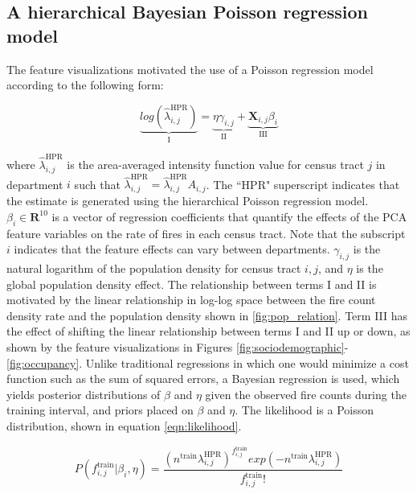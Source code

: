 \documentclass{svjour3}
\begin{document}
  
  
  \clearpage
  
 \subsection{A hierarchical Bayesian Poisson regression model}
 \label{sec:bayes}
 The feature visualizations motivated the use of a Poisson regression model according to the following form:
 
 \begin{equation}
  \label{eqn:poisson_regression}
  \underbrace{log(\hat\lambda^{\text{HPR}}_{i,j})}_{\text{I}} =   \underbrace{\eta\gamma_{i,j}}_{\text{II}} + \underbrace{\textbf{X}_{i,j}\beta_{i}}_{\text{III}}
\end{equation}

\noindent where $\hat\lambda^{\text{HPR}}_{i,j}$ is the area-averaged intensity function value for census tract $j$ in department $i$ such that $\hat\lambda^{\text{HPR}}_{i,j}=\hat\lambda^{\text{HPR}}_{i,j}A_{i,j}$. The ``HPR" superscript indicates that the estimate is generated using the hierarchical Poisson regression model. $\beta_i \in \textbf{R}^{10}$ is a vector of regression coefficients that quantify the effects of the PCA feature variables on the rate of fires in each census tract. Note that the subscript $i$ indicates that the feature effects can vary between departments. $\gamma_{i,j}$ is the natural logarithm of the population density for census tract $i,j$, and $\eta$ is the global population density effect. The relationship between terms I and II is motivated by the linear relationship in log-log space between the fire count density rate and the population density shown in \ref{fig:pop_relation}. Term III has the effect of shifting the linear relationship between terms I and II up or down, as shown by the feature visualizations in Figures \ref{fig:sociodemographic}-\ref{fig:occupancy}. Unlike traditional regressions in which one would minimize a cost function such as the sum of squared errors, a Bayesian regression is used, which yields posterior distributions of $\beta$ and $\eta$ given the observed fire counts during the training interval, and priors placed on $\beta$ and $\eta$. The likelihood is a Poisson distribution, shown in equation \ref{eqn:likelihood}.

 \begin{equation}
  \label{eqn:likelihood}
  P(f^{\text{train}}_{i,j}|\beta_i, \eta) = \frac{(n^{\text{train}}\lambda^{\text{HPR}}_{i,j})^{f^{\text{train}}_{i,j}} exp(-n^{\text{train}}\lambda^{\text{HPR}}_{i,j})}{f^{\text{train}}_{i,j}!}
\end{equation}
\end{document}
